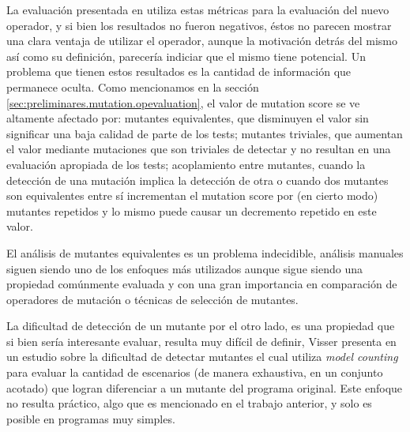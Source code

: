 La evaluaci\'on presentada en \cite{bibliography.mutation.operators.beeBridaS17} utiliza estas m\'etricas para la evaluaci\'on del nuevo operador, y si bien los resultados no fueron negativos, \'estos no parecen mostrar una clara ventaja de utilizar el operador, aunque la motivaci\'on detr\'as del mismo as\'i como su definici\'on, parecer\'ia indiciar que el mismo tiene potencial. Un problema que tienen estos resultados es la cantidad de informaci\'on que permanece oculta. Como mencionamos en la secci\'on \ref{sec:preliminares.mutation.opevaluation}, el valor de mutation score se ve altamente afectado por: mutantes equivalentes, que disminuyen el valor sin significar una baja calidad de parte de los tests; mutantes triviales, que aumentan el valor mediante mutaciones que son triviales de detectar y no resultan en una evaluaci\'on apropiada de los tests; acoplamiento entre mutantes, cuando la detecci\'on de una mutaci\'on implica la detecci\'on de otra o cuando dos mutantes son equivalentes entre s\'i incrementan el mutation score por (en cierto modo) mutantes repetidos y lo mismo puede causar un decremento repetido en este valor.

El an\'alisis de mutantes equivalentes es un problema indecidible, an\'alisis manuales siguen siendo uno de los enfoques m\'as utilizados aunque sigue siendo una propiedad com\'unmente evaluada y con una gran importancia en comparaci\'on de operadores de mutaci\'on o t\'ecnicas de selecci\'on de mutantes.

La dificultad de detecci\'on de un mutante por el otro lado, es una propiedad que si bien ser\'ia interesante evaluar, resulta muy dif\'icil de definir, Visser presenta en \cite{bibliography.mutation.evaluation.hardnessVisser} un estudio sobre la dificultad de detectar mutantes el cual utiliza \emph{model counting} para evaluar la cantidad de escenarios (de manera exhaustiva, en un conjunto acotado) que logran diferenciar a un mutante del programa original. Este enfoque no resulta pr\'actico, algo que es mencionado en el trabajo anterior, y solo es posible en programas muy simples.


